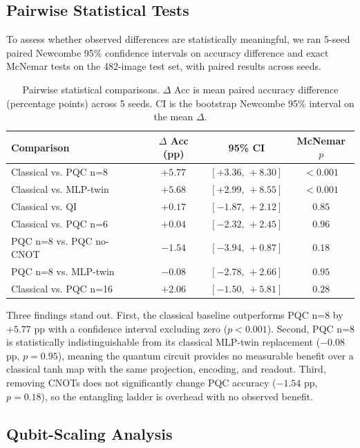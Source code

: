\documentclass[conference]{IEEEtran}
\begin{document}
\subsection{Pairwise Statistical Tests}
To assess whether observed differences are statistically meaningful, we ran 5-seed paired Newcombe 95\% confidence intervals on accuracy difference and exact McNemar tests on the 482-image test set, with paired results across seeds.

\begin{table}[h]
\centering
\caption{Pairwise statistical comparisons. $\Delta$ Acc is mean paired accuracy difference (percentage points) across 5 seeds. CI is the bootstrap Newcombe 95\% interval on the mean $\Delta$.}
\label{tab:stats}
\begin{tabular}{lccc}
\toprule
\textbf{Comparison} & $\Delta$ Acc (pp) & 95\% CI & McNemar $p$ \\
\midrule
Classical vs. PQC n=8          & $+5.77$ & $[+3.36,\,+8.30]$ & $< 0.001$ \\
Classical vs. MLP-twin         & $+5.68$ & $[+2.99,\,+8.55]$ & $< 0.001$ \\
Classical vs. QI               & $+0.17$ & $[-1.87,\,+2.12]$ & $0.85$ \\
Classical vs. PQC n=6          & $+0.04$ & $[-2.32,\,+2.45]$ & $0.96$ \\
PQC n=8 vs. PQC no-CNOT        & $-1.54$ & $[-3.94,\,+0.87]$ & $0.18$ \\
PQC n=8 vs. MLP-twin           & $-0.08$ & $[-2.78,\,+2.66]$ & $0.95$ \\
Classical vs. PQC n=16         & $+2.06$ & $[-1.50,\,+5.81]$ & $0.28$ \\
\bottomrule
\end{tabular}
\end{table}

Three findings stand out. First, the classical baseline outperforms PQC n=8 by $+5.77$ pp with a confidence interval excluding zero ($p < 0.001$). Second, PQC n=8 is statistically indistinguishable from its classical MLP-twin replacement ($-0.08$ pp, $p = 0.95$), meaning the quantum circuit provides no measurable benefit over a classical tanh map with the same projection, encoding, and readout. Third, removing CNOTs does not significantly change PQC accuracy ($-1.54$ pp, $p = 0.18$), so the entangling ladder is overhead with no observed benefit.

\subsection{Qubit-Scaling Analysis}
\end{document}
